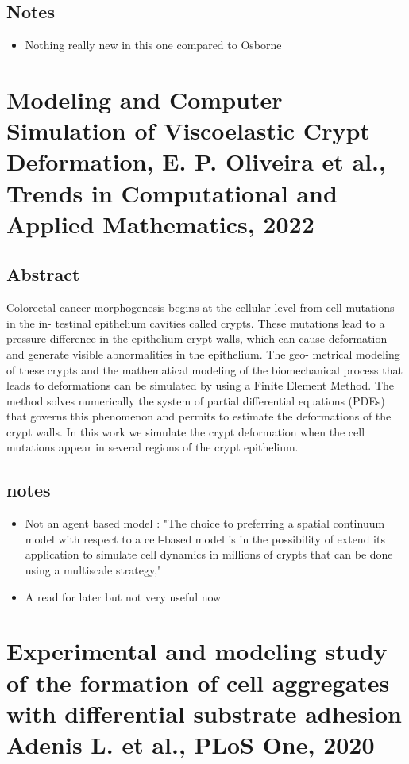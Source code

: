 \documentclass[11pt,a4paper]{article}
\begin{document}
\subsection*{Notes}
\begin{itemize}
\item Nothing really new in this one compared to Osborne
\end{itemize}

\section*{Modeling and Computer Simulation of Viscoelastic Crypt Deformation, E. P. Oliveira et al., Trends in Computational and Applied Mathematics, 2022}
\subsection*{Abstract}
Colorectal cancer morphogenesis begins at the cellular level from cell mutations in the in-
testinal epithelium cavities called crypts. These mutations lead to a pressure difference in the epithelium
crypt walls, which can cause deformation and generate visible abnormalities in the epithelium. The geo-
metrical modeling of these crypts and the mathematical modeling of the biomechanical process that leads
to deformations can be simulated by using a Finite Element Method. The method solves numerically the
system of partial differential equations (PDEs) that governs this phenomenon and permits to estimate the
deformations of the crypt walls. In this work we simulate the crypt deformation when the cell mutations
appear in several regions of the crypt epithelium.

\subsection*{notes}
\begin{itemize}
\item Not an agent based model : "The choice to preferring a spatial continuum model with respect to a cell-based model is in the possibility of extend its application to simulate cell dynamics in millions of crypts that
can be done using a multiscale strategy,"
\item A read for later but not very useful now
\end{itemize}

\section*{Experimental and modeling study of the formation of cell aggregates with differential substrate adhesion Adenis L. et al., PLoS One, 2020}
\end{document}

